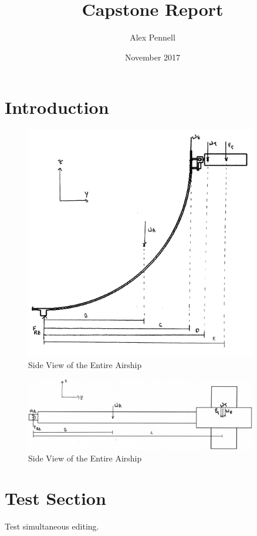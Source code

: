 \documentclass[12pt]{article}
\title{Capstone Report}
\author{Alex Pennell}
\date{November 2017}
\begin{document}
\maketitle

\section{Introduction}

\begin{figure}
	\centering
	\includegraphics[width=0.9\textwidth]{Thruster/ArmThrustDonwards.png}
	\caption{Side View of the Entire Airship}
	\label{fig:FullBlimp}
\end{figure}

\begin{figure}
	\centering
	\includegraphics[width=0.9\textwidth]{Thruster/ArmDown.png}
	\caption{Side View of the Entire Airship}
	\label{fig:FullBlimp}
\end{figure}

\section{Test Section}

Test simultaneous editing.
\end{document}
